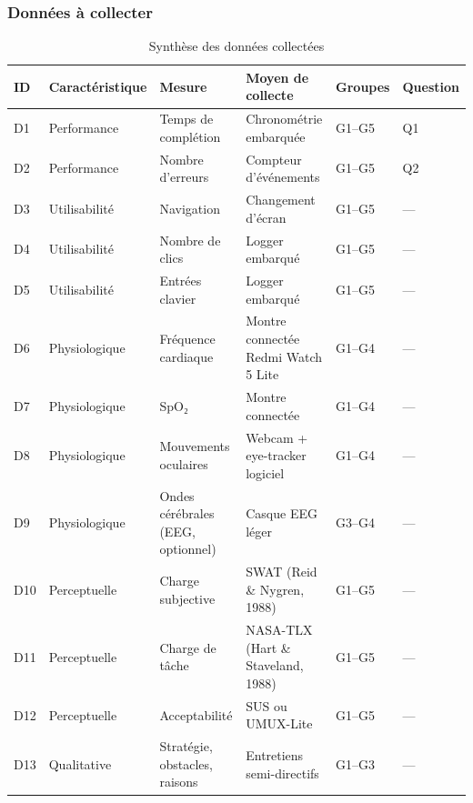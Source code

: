 \documentclass[a4paper,12pt]{article}
\begin{document}
\subsubsection{Données à collecter}
\label{sec:orge77e36d}
\begin{table}[htbp]
\caption{\label{tab:org818a5ba}Synthèse des données collectées}
\centering
\begin{tabular}{llllll}
ID & Caractéristique & Mesure & Moyen de collecte & Groupes & Question\\
\hline
D1 & Performance & Temps de complétion & Chronométrie embarquée & G1–G5 & Q1\\
D2 & Performance & Nombre d’erreurs & Compteur d’événements & G1–G5 & Q2\\
D3 & Utilisabilité & Navigation & Changement d’écran & G1–G5 & —\\
D4 & Utilisabilité & Nombre de clics & Logger embarqué & G1–G5 & —\\
D5 & Utilisabilité & Entrées clavier & Logger embarqué & G1–G5 & —\\
D6 & Physiologique & Fréquence cardiaque & Montre connectée Redmi Watch 5 Lite & G1–G4 & —\\
D7 & Physiologique & SpO₂ & Montre connectée & G1–G4 & —\\
D8 & Physiologique & Mouvements oculaires & Webcam + eye-tracker logiciel & G1–G4 & —\\
D9 & Physiologique & Ondes cérébrales (EEG, optionnel) & Casque EEG léger & G3–G4 & —\\
D10 & Perceptuelle & Charge subjective & SWAT (Reid \& Nygren, 1988) & G1–G5 & —\\
D11 & Perceptuelle & Charge de tâche & NASA-TLX (Hart \& Staveland, 1988) & G1–G5 & —\\
D12 & Perceptuelle & Acceptabilité & SUS ou UMUX-Lite & G1–G5 & —\\
D13 & Qualitative & Stratégie, obstacles, raisons & Entretiens semi-directifs & G1–G3 & —\\
\end{tabular}
\end{table}
\end{document}
